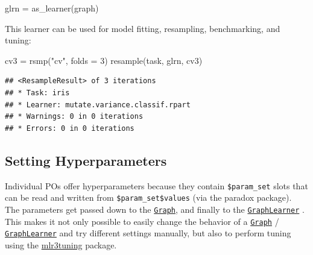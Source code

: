 \documentclass[
]{scrbook}
\newenvironment{Shaded}{\begin{snugshade}}{\end{snugshade}}
\newcommand{\AttributeTok}[1]{\textcolor[rgb]{0.77,0.63,0.00}{#1}}
\newcommand{\DecValTok}[1]{\textcolor[rgb]{0.00,0.00,0.81}{#1}}
\newcommand{\FloatTok}[1]{\textcolor[rgb]{0.00,0.00,0.81}{#1}}
\newcommand{\FunctionTok}[1]{\textcolor[rgb]{0.00,0.00,0.00}{#1}}
\newcommand{\NormalTok}[1]{#1}
\newcommand{\OtherTok}[1]{\textcolor[rgb]{0.56,0.35,0.01}{#1}}
\newcommand{\SpecialCharTok}[1]{\textcolor[rgb]{0.00,0.00,0.00}{#1}}
\newcommand{\StringTok}[1]{\textcolor[rgb]{0.31,0.60,0.02}{#1}}
\renewenvironment{Shaded} {\begin{snugshade}\small} {\end{snugshade}}
\begin{document}
\begin{Shaded}
\begin{Highlighting}[]
\NormalTok{glrn }\OtherTok{=} \FunctionTok{as\_learner}\NormalTok{(graph)}
\end{Highlighting}
\end{Shaded}

This learner can be used for model fitting, resampling, benchmarking, and tuning:

\begin{Shaded}
\begin{Highlighting}[]
\NormalTok{cv3 }\OtherTok{=} \FunctionTok{rsmp}\NormalTok{(}\StringTok{"cv"}\NormalTok{, }\AttributeTok{folds =} \DecValTok{3}\NormalTok{)}
\FunctionTok{resample}\NormalTok{(task, glrn, cv3)}
\end{Highlighting}
\end{Shaded}

\begin{verbatim}
## <ResampleResult> of 3 iterations
## * Task: iris
## * Learner: mutate.variance.classif.rpart
## * Warnings: 0 in 0 iterations
## * Errors: 0 in 0 iterations
\end{verbatim}

\hypertarget{pipe-hyperpars}{%
\subsection{Setting Hyperparameters}\label{pipe-hyperpars}}

Individual POs offer hyperparameters because they contain \texttt{\$param\_set} slots that can be read and written from \texttt{\$param\_set\$values} (via the paradox package).
The parameters get passed down to the \href{https://mlr3pipelines.mlr-org.com/reference/Graph.html}{\texttt{Graph}}, and finally to the \href{https://mlr3pipelines.mlr-org.com/reference/mlr_learners_graph.html}{\texttt{GraphLearner}} .
This makes it not only possible to easily change the behavior of a \href{https://mlr3pipelines.mlr-org.com/reference/Graph.html}{\texttt{Graph}} / \href{https://mlr3pipelines.mlr-org.com/reference/mlr_learners_graph.html}{\texttt{GraphLearner}} and try different settings manually, but also to perform tuning using the \href{https://mlr3tuning.mlr-org.com}{mlr3tuning} package.

\begin{Shaded}
\end{Shaded}
\end{document}
